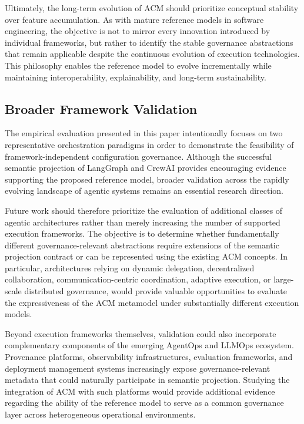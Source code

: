\documentclass[10pt]{article}
\begin{document}
Ultimately, the long-term evolution of ACM should prioritize conceptual stability over feature accumulation. As with mature reference models in software engineering, the objective is not to mirror every innovation introduced by individual frameworks, but rather to identify the stable governance abstractions that remain applicable despite the continuous evolution of execution technologies. This philosophy enables the reference model to evolve incrementally while maintaining interoperability, explainability, and long-term sustainability.

\subsection{Broader Framework Validation}
\label{sec:future_framework_validation}

The empirical evaluation presented in this paper intentionally focuses on two representative orchestration paradigms in order to demonstrate the feasibility of framework-independent configuration governance. Although the successful semantic projection of LangGraph and CrewAI provides encouraging evidence supporting the proposed reference model, broader validation across the rapidly evolving landscape of agentic systems remains an essential research direction.

Future work should therefore prioritize the evaluation of additional classes of agentic architectures rather than merely increasing the number of supported execution frameworks. The objective is to determine whether fundamentally different governance-relevant abstractions require extensions of the semantic projection contract or can be represented using the existing ACM concepts. In particular, architectures relying on dynamic delegation, decentralized collaboration, communication-centric coordination, adaptive execution, or large-scale distributed governance, would provide valuable opportunities to evaluate the expressiveness of the ACM metamodel under substantially different execution models.

Beyond execution frameworks themselves, validation could also incorporate complementary components of the emerging AgentOps and LLMOps ecosystem. Provenance platforms, observability infrastructures, evaluation frameworks, and deployment management systems increasingly expose governance-relevant metadata that could naturally participate in semantic projection. Studying the integration of ACM with such platforms would provide additional evidence regarding the ability of the reference model to serve as a common governance layer across heterogeneous operational environments.
\end{document}
